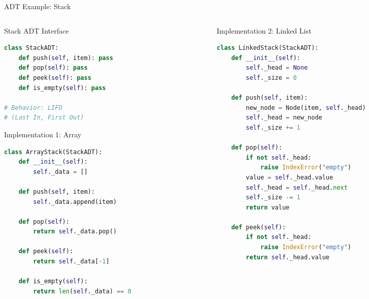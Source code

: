 \documentclass[aspectratio=169,xcolor=dvipsnames]{beamer}
\begin{document}
\begin{frame}[fragile]{ADT Example: Stack}
  \begin{columns}
    \begin{column}{0.48\textwidth}
      \begin{block}{Stack ADT Interface}
        \begin{lstlisting}[language=Python,basicstyle=\tiny\ttfamily]
class StackADT:
    def push(self, item): pass
    def pop(self): pass
    def peek(self): pass
    def is_empty(self): pass

# Behavior: LIFO
# (Last In, First Out)
        \end{lstlisting}
      \end{block}

      \vspace{0.3cm}

      \begin{exampleblock}{Implementation 1: Array}
        \begin{lstlisting}[language=Python,basicstyle=\tiny\ttfamily]
class ArrayStack(StackADT):
    def __init__(self):
        self._data = []

    def push(self, item):
        self._data.append(item)

    def pop(self):
        return self._data.pop()

    def peek(self):
        return self._data[-1]

    def is_empty(self):
        return len(self._data) == 0
        \end{lstlisting}
      \end{exampleblock}
    \end{column}
    \begin{column}{0.48\textwidth}
      \begin{exampleblock}{Implementation 2: Linked List}
        \begin{lstlisting}[language=Python,basicstyle=\tiny\ttfamily]
class LinkedStack(StackADT):
    def __init__(self):
        self._head = None
        self._size = 0

    def push(self, item):
        new_node = Node(item, self._head)
        self._head = new_node
        self._size += 1

    def pop(self):
        if not self._head:
            raise IndexError("empty")
        value = self._head.value
        self._head = self._head.next
        self._size -= 1
        return value

    def peek(self):
        if not self._head:
            raise IndexError("empty")
        return self._head.value


\end{lstlisting}
\end{exampleblock}
\end{column}
\end{columns}
\end{frame}
\end{document}
